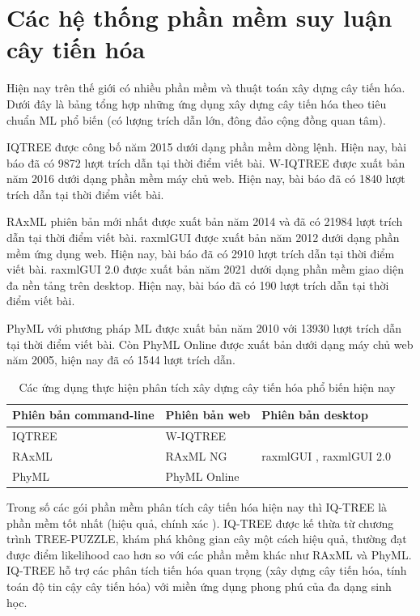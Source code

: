 \documentclass[12pt]{report}
\begin{document}
\section{Các hệ thống phần mềm suy luận cây tiến hóa }
Hiện nay trên thế giới có nhiều phần mềm và thuật toán xây dựng cây tiến hóa. Dưới đây là bảng tổng hợp những ứng dụng xây dựng cây tiến hóa theo tiêu chuẩn ML phổ biến (có lượng trích dẫn lớn, đông đảo cộng đồng quan tâm). 

IQTREE được công bố năm 2015 dưới dạng phần mềm dòng lệnh. Hiện nay, bài báo đã có 9872 lượt trích dẫn tại thời điểm viết bài. W-IQTREE được xuất bản năm 2016 dưới dạng phần mềm máy chủ web. Hiện nay, bài báo đã có 1840 lượt trích dẫn tại thời điểm viết bài.

RAxML phiên bản mới nhất được xuất bản năm 2014 và đã có 21984 lượt trích dẫn tại thời điểm viết bài. raxmlGUI được xuất bản năm 2012 dưới dạng phần mềm ứng dụng web. Hiện nay, bài báo đã có 2910 lượt trích dẫn tại thời điểm viết bài. raxmlGUI 2.0 được xuất bản năm 2021 dưới dạng phần mềm giao diện đa nền tảng trên desktop. Hiện nay, bài báo đã có 190 lượt trích dẫn tại thời điểm viết bài.

PhyML với phương pháp ML được xuất bản năm 2010 với 13930 lượt trích dẫn tại thời điểm viết bài. Còn PhyML Online được xuất bản dưới dạng máy chủ web năm 2005, hiện nay đã có 1544 lượt trích dẫn.

\begin{table}[h]
	\centering
	\caption{Các ứng dụng thực hiện phân tích xây dựng cây tiến hóa phổ biến hiện nay}
	\label{tbl:table1.1}
	\begin{tabular}{|p{3cm}|l|l|l|}
		\hline
		\textbf{Phiên bản command-line} & \textbf{Phiên bản web} & \textbf{Phiên bản desktop} \\ \hline
		IQTREE \cite{cia-3}              & W-IQTREE \cite{cia-4}        &                                  \\ \hline
		RAxML \cite{cia-5}             &   RAxML NG \cite{cia-5.5}    &           raxmlGUI \cite{cia-6},   raxmlGUI 2.0 \cite{cia-7}                    \\ \hline
		PhyML \cite{cia-8}             & PhyML Online \cite{cia-9}    &                                  \\ \hline
	\end{tabular}
\end{table}

Trong số các gói phần mềm phân tích cây tiến hóa hiện nay thì IQ-TREE là phần mềm tốt nhất (hiệu quả, chính xác \cite{cia-14} \cite{cia-15}). IQ-TREE được kế thừa từ chương trình TREE-PUZZLE\cite{cia-16}, khám phá không gian cây một cách hiệu quả, thường đạt được điểm likelihood cao hơn so với các phần mềm khác như RAxML và PhyML. IQ-TREE hỗ trợ các phân tích tiến hóa quan trọng (xây dựng cây tiến hóa, tính toán độ tin cậy cây tiến hóa) với miền ứng dụng phong phú của đa dạng sinh học. 
\end{document}
